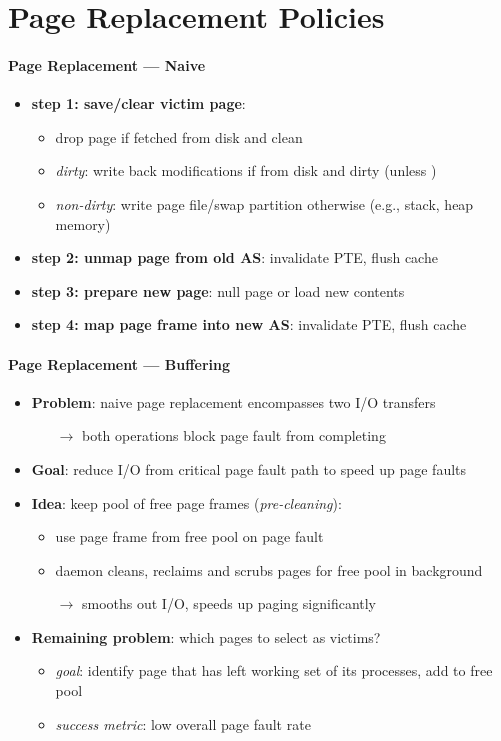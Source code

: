 \section{Page Replacement Policies}

\paragraph{Page Replacement --- Naive}
\begin{itemize}
  \item \textbf{step 1: save/clear victim page}:
  \begin{itemize}
    \item drop page if fetched from disk and clean
    \item \emph{dirty}: write back modifications if from disk and dirty (unless )
    \item \emph{non-dirty}: write page file/swap partition otherwise (e.g., stack, heap memory)
  \end{itemize}
  \item \textbf{step 2: unmap page from old AS}: invalidate PTE, flush cache
  \item \textbf{step 3: prepare new page}: null page or load new contents
  \item \textbf{step 4: map page frame into new AS}: invalidate PTE, flush cache
\end{itemize}

\paragraph{Page Replacement --- Buffering}
\begin{itemize}
  \item \textbf{Problem}: naive page replacement encompasses two I/O transfers
  \begin{itemize}
    \item[$ \to $] both operations block page fault from completing
  \end{itemize}
  \item \textbf{Goal}: reduce I/O from critical page fault path to speed up page faults
  \item \textbf{Idea}: keep pool of free page frames (\emph{pre-cleaning}):
  \begin{itemize}
    \item use page frame from free pool on page fault
    \item daemon cleans, reclaims and scrubs pages for free pool in background
    \item[$ \to $] smooths out I/O, speeds up paging significantly
  \end{itemize}
  \item \textbf{Remaining problem}: which pages to select as victims?
  \begin{itemize}
    \item \emph{goal}: identify page that has left working set of its processes, add to free pool
    \item \emph{success metric}: low overall page fault rate
  \end{itemize}
\end{itemize}


